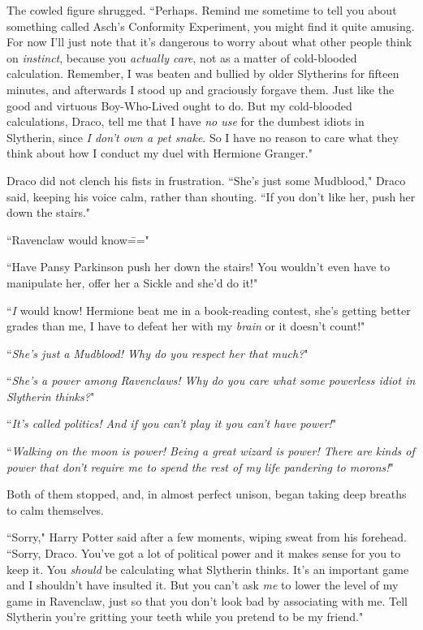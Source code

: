 The cowled figure shrugged. ``Perhaps. Remind me sometime to tell you about something called Asch's Conformity Experiment, you might find it quite amusing. For now I'll just note that it's dangerous to worry about what other people think on \emph{instinct}, because you \emph{actually care}, not as a matter of cold-blooded calculation. Remember, I was beaten and bullied by older Slytherins for fifteen minutes, and afterwards I stood up and graciously forgave them. Just like the good and virtuous Boy-Who-Lived ought to do. But my cold-blooded calculations, Draco, tell me that I have \emph{no use} for the dumbest idiots in Slytherin, since \emph{I don't own a pet snake}. So I have no reason to care what they think about how I conduct my duel with Hermione Granger."

Draco did not clench his fists in frustration. ``She's just some Mudblood," Draco said, keeping his voice calm, rather than shouting. ``If you don't like her, push her down the stairs."

``Ravenclaw would know\==="

``Have Pansy Parkinson push her down the stairs! You wouldn't even have to manipulate her, offer her a Sickle and she'd do it!"

``\emph{I} would know! Hermione beat me in a book-reading contest, she's getting better grades than me, I have to defeat her with my \emph{brain} or it doesn't count!"

``\emph{She's just a Mudblood! Why do you respect her that much?}"

``\emph{She's a power among Ravenclaws! Why do you care what some powerless idiot in Slytherin thinks?}"

``\emph{It's called politics! And if you can't play it you can't have power!}"

``\emph{Walking on the moon is power! Being a great wizard is power! There are kinds of power that don't require me to spend the rest of my life pandering to morons!}"

Both of them stopped, and, in almost perfect unison, began taking deep breaths to calm themselves.

``Sorry," Harry Potter said after a few moments, wiping sweat from his forehead. ``Sorry, Draco. You've got a lot of political power and it makes sense for you to keep it. You \emph{should} be calculating what Slytherin thinks. It's an important game and I shouldn't have insulted it. But you can't ask \emph{me} to lower the level of my game in Ravenclaw, just so that you don't look bad by associating with me. Tell Slytherin you're gritting your teeth while you pretend to be my friend."

